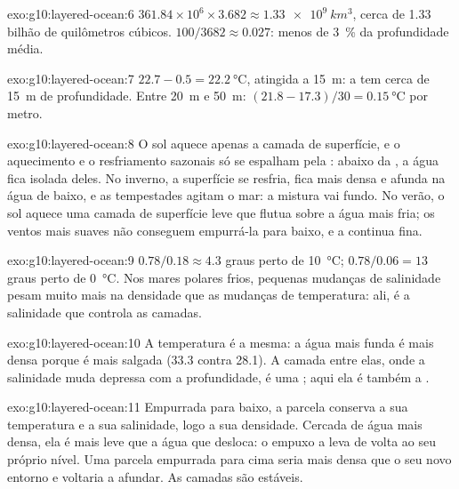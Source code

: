 \begin{solution}{exo:g10:layered-ocean:6}
$361.84\times10^6 \times 3.682 \approx \qty{1.33e9}{km^3}$, cerca de
\num{1.33} bilhão de quilômetros cúbicos. $100/3682 \approx 0.027$: menos de
\qty{3}{\percent} da profundidade média.
\end{solution}

\begin{solution}{exo:g10:layered-ocean:7}
$22.7 - 0.5 = \qty{22.2}{\degreeCelsius}$, atingida a \qty{15}{m}: a  tem cerca de \qty{15}{m} de profundidade. Entre \qty{20}{m} e
\qty{50}{m}: $(21.8 - 17.3)/30 = \qty{0.15}{\degreeCelsius}$ por metro.
\end{solution}

\begin{solution}{exo:g10:layered-ocean:8}
O sol aquece apenas a camada de superfície, e o aquecimento e o resfriamento
sazonais só se espalham pela : abaixo da , a água
fica isolada deles. No inverno, a superfície se resfria, fica mais densa e
afunda na água de baixo, e as tempestades agitam o mar: a mistura vai
fundo. No verão, o sol aquece uma camada de superfície leve que flutua
sobre a água mais fria; os ventos mais suaves não conseguem empurrá-la para
baixo, e a  continua fina.
\end{solution}

\begin{solution}{exo:g10:layered-ocean:9}
$0.78/0.18 \approx 4.3$ graus perto de \qty{10}{\degreeCelsius};
$0.78/0.06 = 13$ graus perto de \qty{0}{\degreeCelsius}. Nos mares polares
frios, pequenas mudanças de salinidade pesam muito mais na densidade que as
mudanças de temperatura: ali, é a salinidade que controla as camadas.
\end{solution}

\begin{solution}{exo:g10:layered-ocean:10}
A temperatura é a mesma: a água mais funda é mais densa porque é mais
salgada (33.3 contra 28.1). A camada entre elas, onde a salinidade muda
depressa com a profundidade, é uma ; aqui ela é também a
.
\end{solution}

\begin{solution}{exo:g10:layered-ocean:11}
Empurrada para baixo, a parcela conserva a sua temperatura e a sua
salinidade, logo a sua densidade. Cercada de água mais densa, ela é mais
leve que a água que desloca: o empuxo a leva de volta ao seu próprio nível.
Uma parcela empurrada para cima seria mais densa que o seu novo entorno e
voltaria a afundar. As camadas são estáveis.
\end{solution}

